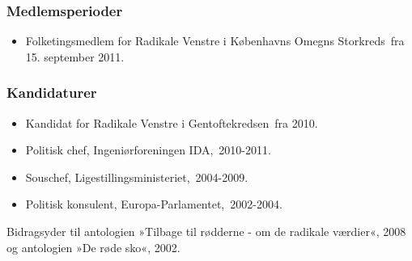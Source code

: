 \documentclass[11pt, a4paper]{awesome-cv}
\begin{document}
\begin{cvletter}
\subsubsection*{Medlemsperioder}
\begin{itemize}
\item Folketingsmedlem for Radikale Venstre i Københavns Omegns Storkreds fra 15. september 2011.
\end{itemize}
\subsubsection*{Kandidaturer}
\begin{itemize}
\item Kandidat for Radikale Venstre i Gentoftekredsen fra 2010.
\end{itemize}
\begin{itemize}
\item Politisk chef, Ingeniørforeningen IDA, 2010-2011.
\item Souschef, Ligestillingsministeriet, 2004-2009.
\item Politisk konsulent, Europa-Parlamentet, 2002-2004.
\end{itemize}
Bidragsyder til antologien »Tilbage til rødderne - om de radikale værdier«, 2008 og antologien  »De røde sko«, 2002.

\end{cvletter}
\end{document}

